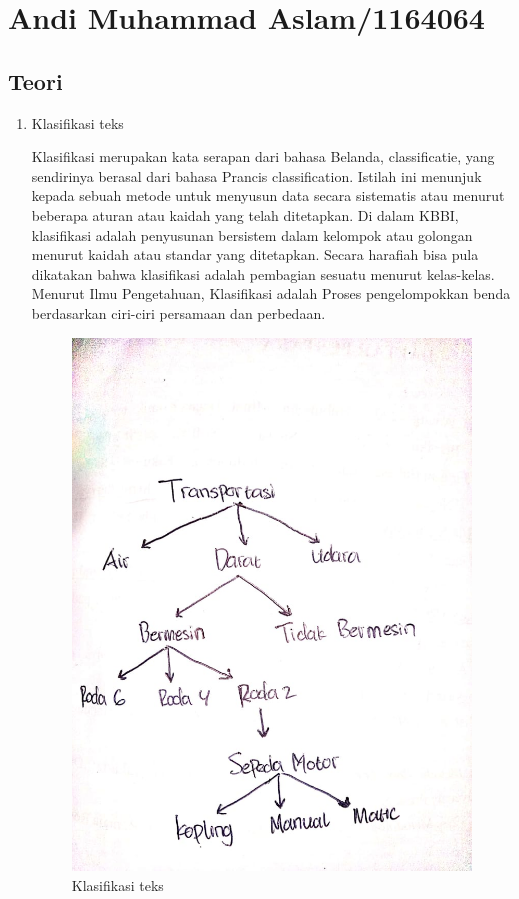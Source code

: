 \section{Andi Muhammad Aslam/1164064}

\subsection{Teori}
\begin{enumerate}
\item Klasifikasi teks
	\par Klasifikasi merupakan kata serapan dari bahasa Belanda, classificatie, yang sendirinya berasal dari bahasa Prancis classification. Istilah ini menunjuk kepada sebuah metode untuk menyusun data secara sistematis atau menurut beberapa aturan atau kaidah yang telah ditetapkan.
	Di dalam KBBI, klasifikasi adalah penyusunan bersistem dalam kelompok atau golongan menurut kaidah atau standar yang ditetapkan. Secara harafiah bisa pula dikatakan bahwa klasifikasi adalah pembagian sesuatu menurut kelas-kelas. Menurut Ilmu Pengetahuan, Klasifikasi adalah Proses pengelompokkan benda berdasarkan ciri-ciri persamaan dan perbedaan.
	\begin{figure}[ht]
		\centering
		\includegraphics[scale=0.5]{figures/andi/4-1.jpeg}
		\caption{Klasifikasi teks}
		\label{Contoh Ilustrasi}
	\end{figure}
	

\end{enumerate}
